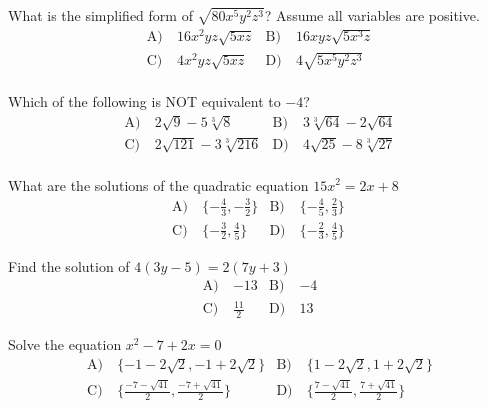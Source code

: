 \begin{problem}\label{Alg10}
What is the simplified form of $\sqrt{80x^5y^2z^3}$? Assume all variables are positive.
\begin{align*}
\text{A)}\ & 16x^2yz\sqrt{5xz} &
\text{B)}\ & 16xyz\sqrt{5x^3z}  \\
\text{C)}\ & 4x^2yz\sqrt{5xz}  &
\text{D)}\ & 4\sqrt{5x^5y^2z^3}\\
\end{align*}
\end{problem}



\begin{problem}\label{Alg11}
Which of the following is NOT equivalent to $-4$?
\begin{align*}
\text{A)}\ & 2\sqrt{9}-5\sqrt[3]{8} &
\text{B)}\ & 3\sqrt[3]{64}-2\sqrt{64} \\
\text{C)}\ & 2\sqrt{121}-3\sqrt[3]{216}  &
\text{D)}\ & 4\sqrt{25}-8\sqrt[3]{27}\\
\end{align*}    
\end{problem}




\begin{problem}\label{Alg12}
What are the solutions of the quadratic equation $15x^2=2x+8$
\begin{align*}
\text{A)}\ & \{-\frac{4}{3},-\frac{3}{2}\} &
\text{B)}\ & \{-\frac{4}{5},\frac{2}{3}\} \\
\text{C)}\ & \{-\frac{3}{2},\frac{4}{5}\}  &
\text{D)}\ & \{-\frac{2}{3},\frac{4}{5}\}\
\end{align*}   
\end{problem}


\begin{problem}\label{Alg13}
Find the solution of $4(3y-5)=2(7y+3)$
\begin{align*}
\text{A)}\ & -13 &
\text{B)}\ & -4 \\
\text{C)}\ & \frac{11}{2}  &
\text{D)}\ & 13\
\end{align*} 
\end{problem}


\begin{problem}\label{Alg14}
Solve the equation $x^2-7+2x=0$
\begin{align*}
\text{A)}\ & \{-1-2\sqrt{2},-1+2\sqrt{2}\} &
\text{B)}\ & \{1-2\sqrt{2},1+2\sqrt{2}\}\\
\text{C)}\ & \{\frac{-7-\sqrt{41}}{2},\frac{-7+\sqrt{41}}{2}\}  &
\text{D)}\ & \{\frac{7-\sqrt{41}}{2},\frac{7+\sqrt{41}}{2}\}\
\end{align*}  
\end{problem}


